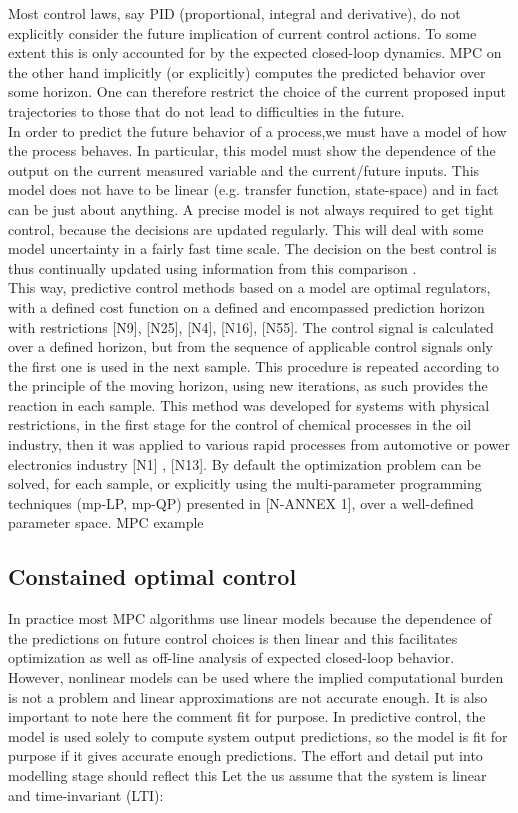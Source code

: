 Most control laws, say PID (proportional, integral and derivative), do not explicitly consider the future implication of current control actions. To some extent this is only accounted for by the expected closed-loop dynamics. MPC on the other hand
implicitly (or explicitly) computes the predicted behavior over some horizon. One can therefore restrict the choice of the current proposed input trajectories to those that do not lead to difficulties in the future.\\
In order to predict the future behavior of a process,we must have a model of how the process behaves. In particular, this model must show the dependence of the output on the current measured variable and the current/future inputs. This model does not
have to be linear (e.g. transfer function, state-space) and in fact can be just about anything. A precise model is not always required to get tight control, because the decisions are updated regularly. This will deal with some model uncertainty in a fairly
fast time scale. The decision on the best control is thus continually updated using information from this comparison \cite{rossiter2017model}.\\
This way, predictive control methods based on a model are optimal regulators, with a defined cost function on a defined and encompassed  	prediction horizon with restrictions [N9], [N25], [N4], [N16], [N55]. The control signal is calculated over a defined horizon, but from the sequence of applicable control signals only the first one is used in the next sample. This procedure is repeated according to the principle of the moving horizon, using new iterations, as such provides the reaction in each sample. This method was developed for systems with physical restrictions, in the first stage for the control of chemical processes in the oil industry, then it was applied to various rapid processes from automotive or power electronics industry [N1] , [N13]. By default the optimization problem can be solved, for each sample, or explicitly using the multi-parameter programming techniques (mp-LP, mp-QP) presented in [N-ANNEX 1], over a well-defined parameter space.
	MPC example
	
	\subsection{Constained optimal control}\label{BASICCSR:sec:OptimalControl}
	
	In practice most MPC algorithms use linear models because the dependence of the predictions on future control choices is then linear and this facilitates optimization as well as off-line analysis of expected closed-loop behavior. However, nonlinear
models can be used where the implied computational burden is not a problem and linear approximations are not accurate enough.
It is also important to note here the comment fit for purpose. In predictive control, the model is used solely to compute system output predictions, so the model is fit for purpose if it gives accurate enough predictions. The effort and detail put into
modelling stage should reflect this
	Let the us assume that the system is linear and time-invariant (LTI):
	
